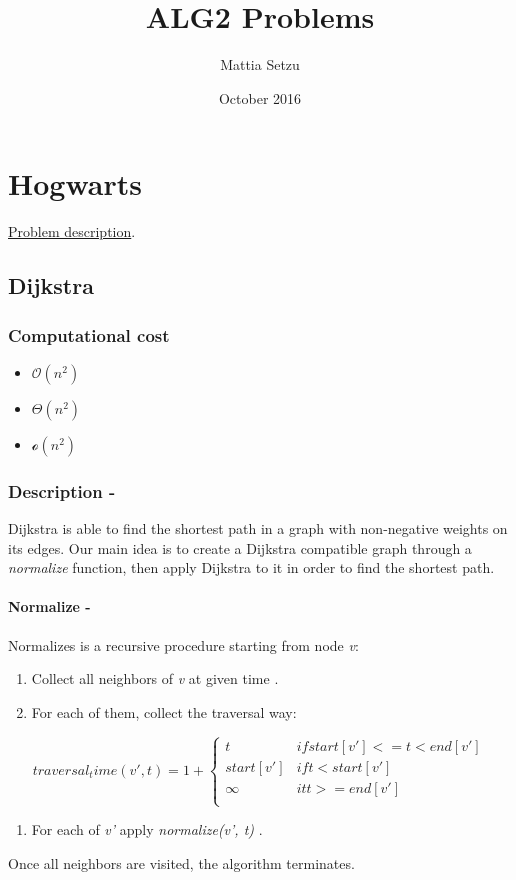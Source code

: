 \documentclass{article}
\title{ALG2 Problems}
\author{Mattia Setzu}
\date{October 2016}
\begin{document}
\maketitle

\tableofcontents

\section{Hogwarts}
\href{http://didawiki.cli.di.unipi.it/lib/exe/fetch.php/magistraleinformatica/alg2/algo2_16/hogwarts.pdf}{Problem description}.

\subsection{Dijkstra}
\subsubsection{Computational cost}
\begin{itemize}
    \item $\mathcal{O}(n^{2})$
    \item $\Theta(n^{2})$
    \item $\mathcal{o}(n^{2})$
\end{itemize}
\subsubsection{Description -} Dijkstra is able to find the shortest path in a graph with non-negative weights on its edges.
Our main idea is to create a Dijkstra compatible graph through a \emph{normalize} function, then apply Dijkstra to it in order to find the shortest path.

\paragraph{Normalize -} Normalizes is a recursive procedure starting from node \emph{v}:
\begin{enumerate}
    \item Collect all neighbors of \emph{v} at given time \emph{}.
    \item For each of them, collect the traversal way:
\end{enumerate}

    \begin{equation}
    traversal_time(v', t) = 1 + \begin{cases}
                                t           &   if start[v'] <= t < end[v']     \\
                                start[v']   &   if t < start[v']                \\
                                \infty      &   it t >= end[v']                 \\
                                \end{cases}
    \end{equation}
\begin{enumerate}
    \item For each of \emph{v'} apply \emph{normalize(v', t)} .
\end{enumerate}
Once all neighbors are visited, the algorithm terminates.
\end{document}
